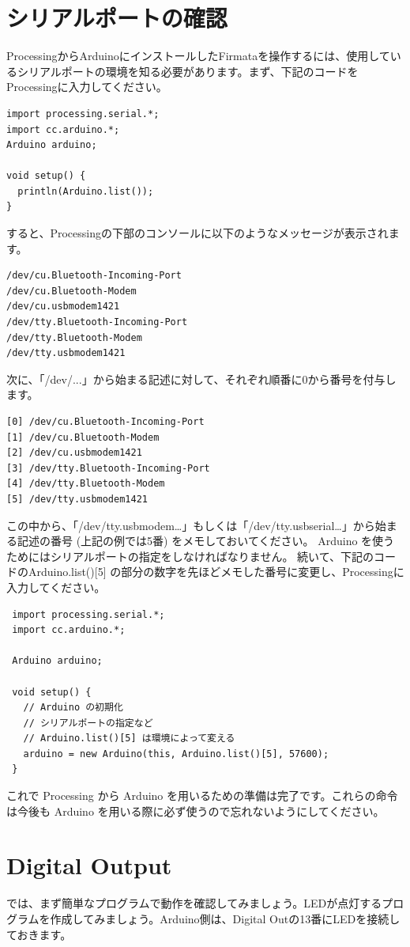 \documentclass[11pt,a4paper]{jarticle}
\begin{document}
\section{シリアルポートの確認}
ProcessingからArduinoにインストールしたFirmataを操作するには、使用しているシリアルポートの環境を知る必要があります。まず、下記のコードをProcessingに入力してください。
\begin{lstlisting}
import processing.serial.*;
import cc.arduino.*;
Arduino arduino;
 
void setup() {
  println(Arduino.list());
}
\end{lstlisting}
すると、Processingの下部のコンソールに以下のようなメッセージが表示されます。
\begin{lstlisting}
/dev/cu.Bluetooth-Incoming-Port
/dev/cu.Bluetooth-Modem
/dev/cu.usbmodem1421
/dev/tty.Bluetooth-Incoming-Port
/dev/tty.Bluetooth-Modem
/dev/tty.usbmodem1421
\end{lstlisting}
次に、「/dev/...」から始まる記述に対して、それぞれ順番に0から番号を付与します。
\begin{lstlisting}
[0] /dev/cu.Bluetooth-Incoming-Port
[1] /dev/cu.Bluetooth-Modem
[2] /dev/cu.usbmodem1421
[3] /dev/tty.Bluetooth-Incoming-Port
[4] /dev/tty.Bluetooth-Modem
[5] /dev/tty.usbmodem1421
\end{lstlisting}
この中から、「/dev/tty.usbmodem…」もしくは「/dev/tty.usbserial…」から始まる記述の番号 (上記の例では5番) をメモしておいてください。
Arduino を使うためにはシリアルポートの指定をしなければなりません。
続いて、下記のコードのArduino.list()[5] の部分の数字を先ほどメモした番号に変更し、Processingに入力してください。
\begin{lstlisting}
 import processing.serial.*;
 import cc.arduino.*;

 Arduino arduino;

 void setup() {
   // Arduino の初期化
   // シリアルポートの指定など
   // Arduino.list()[5] は環境によって変える
   arduino = new Arduino(this, Arduino.list()[5], 57600);
 }
\end{lstlisting}

これで Processing から Arduino を用いるための準備は完了です。これらの命令は今後も Arduino を用いる際に必ず使うので忘れないようにしてください。

\section{Digital Output}
では、まず簡単なプログラムで動作を確認してみましょう。LEDが点灯するプログラムを作成してみましょう。Arduino側は、Digital Outの13番にLEDを接続しておきます。
\end{document}
